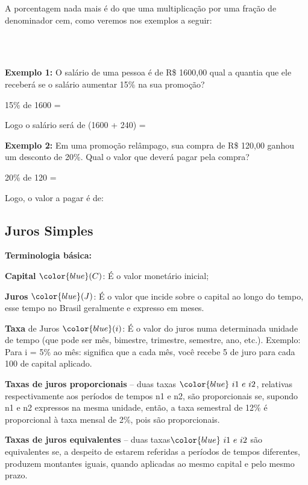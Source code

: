\begin{multicols*}{2}
	A porcentagem nada mais é do que uma multiplicação por uma fração de denominador cem, como veremos nos exemplos a seguir:

	\\

	\\


	\textbf{Exemplo 1:} O salário de uma pessoa é de R\$ 1600,00 qual a quantia que ele receberá se o salário aumentar 15\% na sua promoção?

	15\% de 1600  =  

	Logo o salário será de (1600 + 240) = 

	\textbf{Exemplo 2:} Em uma promoção relâmpago, sua compra de R\$ 120,00 ganhou um desconto de 20\%. Qual o valor que deverá pagar pela compra?

	20\% de 120  =  

	Logo, o valor a pagar é de: 

	\subsection{Juros Simples}

	\textbf{Terminologia básica:}

	\textbf{Capital} $\color{blue}(C)$: É o valor monetário inicial;

	\textbf{Juros} $\color{blue}(J)$: É o valor que incide sobre o capital ao longo do tempo, esse tempo no Brasil geralmente e expresso em meses.

	\textbf{Taxa} de Juros $\color{blue}(i)$: É o valor do juros numa determinada unidade de tempo (que pode ser mês, bimestre, trimestre, semestre, ano, etc.). Exemplo: Para i = 5\% ao mês: significa que a cada mês, você recebe 5 de juro para cada 100 de capital aplicado.

	\textbf{Taxas de juros proporcionais} – duas taxas  $\color{blue} \ i1\ e \ i2$, relativas respectivamente aos períodos de tempos n1 e n2, são proporcionais se, supondo n1 e n2 expressos na mesma unidade, então, a taxa semestral de 12\% é proporcional à taxa mensal de 2\%, pois são proporcionais.

	\textbf{Taxas de juros equivalentes} – duas taxas$\color{blue} \  i1 \ e \ i2$ são equivalentes se, a despeito de estarem referidas a períodos de tempos diferentes, produzem montantes iguais, quando aplicadas ao mesmo capital e pelo mesmo prazo.


\end{multicols*}
